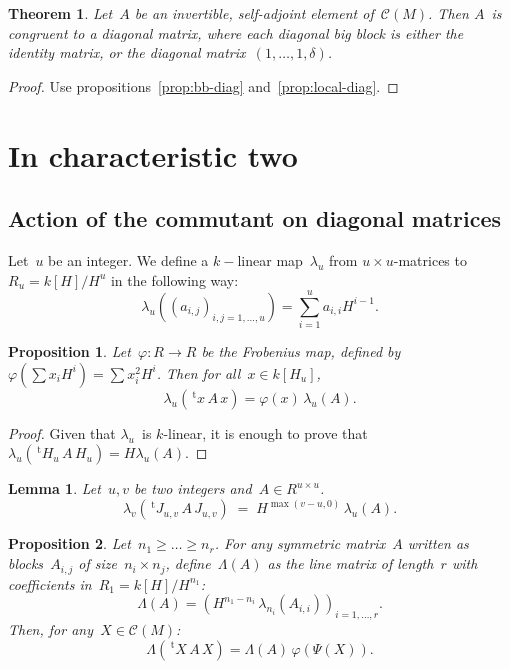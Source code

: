 \documentclass{article}%
\newtheorem{prop}{Proposition}
\newtheorem{thm}{Theorem}
\newtheorem{lem}{Lemma}
\let\ro\mathscr
\def\transpose{\,{}^{\mathrm{t}\!}}
\begin{document}
\begin{thm}\label{thm:diag}
Let~$A$ be an invertible, self-adjoint element of~$\ro C(M)$. Then $A$~is
congruent to a diagonal matrix, where each diagonal big block is either
the identity matrix, or the diagonal matrix~$(1, …, 1, δ)$.
\end{thm}

\begin{proof}
Use propositions~\ref{prop:bb-diag} and~\ref{prop:local-diag}.
\end{proof}


\section{In characteristic two}%
\subsection{Action of the commutant on diagonal matrices}

Let~$u$ be an integer. We define a $k-$linear map~$λ_u$ from $u ×
u$-matrices to~$R_u = k[H]/H^u$ in the following way:
\begin{equation}
λ_u((a_{i,j})_{i,j=1,…,u}) = ∑_{i=1}^{u} a_{i,i} H^{i-1}.
\end{equation}

\begin{prop}
Let~$φ: R → R$ be the Frobenius map, defined by~$φ(∑ x_i H^i) = ∑
x_i^2 H^i$. Then for all~$x ∈ k[H_u]$,
\begin{equation}
λ_u (\transpose{x} \, A\, x) = φ(x)\, λ_u(A).
\end{equation}
\end{prop}


\begin{proof}
Given that $λ_u$~is $k$-linear, it is enough to prove that
$λ_u(\transpose{H_u} \, A\, H_u) = H λ_u(A)$.
\end{proof}


\begin{lem}
Let~$u, v$ be two integers and~$A ∈ R^{u × u}$.
\begin{equation}
λ_v ( \transpose{J_{u,v}}\, A\, J_{u,v}) \;=\;
H^{\max (v-u, 0)}\,λ_u(A).
\end{equation}
\end{lem}


\begin{prop}
Let~$n_1 ≥ … ≥ n_r$. For any symmetric matrix~$A$ written as
blocks~$A_{i,j}$ of size~$n_i × n_j$, define~$Λ(A)$ as the line matrix of
length~$r$ with coefficients in~$R_1 = k[H]/H^{n_1}$:
\begin{equation*}
Λ(A) = ( H^{n_1 - n_i}\, λ_{n_i} (A_{i,i}))_{i=1,…, r}.
\end{equation*}
Then, for any~$X ∈ \ro C(M)$:
\begin{equation}
Λ(\transpose{X}\,A\,X) = Λ(A)\, φ(Ψ(X)).
\end{equation}
\end{prop}
\end{document}
